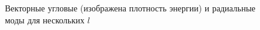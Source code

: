 \documentclass[compress]{beamer}
\begin{document}
    \begin{frame}

        \begin{figure}[h]
            \centering
            \caption[]{Векторные угловые (изображена плотность энергии) и радиальные моды для нескольких $l$}
        \end{figure}

    \end{frame}

\end{document}
